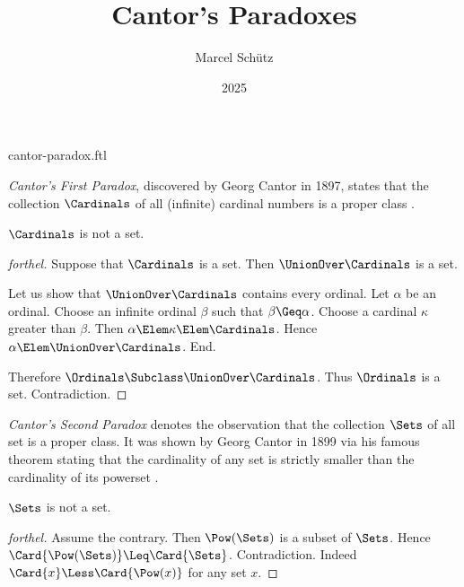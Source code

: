 \documentclass{stex}
\title{Cantor's Paradoxes}
\author{Marcel Schütz}
\date{2025}
\begin{document}
\begin{smodule}{cantor-paradox.ftl}



\maketitle

\noindent \emph{Cantor's First Paradox}, discovered by Georg Cantor in 1897,
states that the collection $\Cardinals$ of all (infinite) cardinal numbers is a
proper class \cite[chapter 156]{Cantor1991}.

\begin{theorem}[forthel,title=Cantor's First Paradox,name=Cantor Paradox I]
  $\Cardinals$ is not a set.
\end{theorem}
\begin{proof}[forthel]
  Suppose that $\Cardinals$ is a set.
  Then $\UnionOver \Cardinals$ is a set.

  Let us show that $\UnionOver \Cardinals$ contains every ordinal.
    Let $\alpha$ be an ordinal.
    Choose an infinite ordinal $\beta$ such that $\beta \Geq \alpha$.
    Choose a cardinal $\kappa$ greater than $\beta$.
    Then $\alpha \Elem \kappa \Elem \Cardinals$.
    Hence $\alpha \Elem \UnionOver \Cardinals$.
  End.

  Therefore $\Ordinals \Subclass \UnionOver \Cardinals$.
  Thus $\Ordinals$ is a set.
  Contradiction.
\end{proof}

\emph{Cantor's Second Paradox} denotes the observation that the collection
$\Sets$ of all set is a proper class.
It was shown by Georg Cantor in 1899 via his famous theorem stating that the
cardinality of any set is strictly smaller than the cardinality of its 
powerset \cite[chapter 163]{Cantor1991}.

\begin{theorem}[forthel,title=Cantor's Second Paradox,name=Cantor Paradox II]
  $\Sets$ is not a set.
\end{theorem}
\begin{proof}[forthel]
  Assume the contrary.
  Then $\Pow(\Sets)$ is a subset of $\Sets$.
  Hence $\Card{\Pow(\Sets)} \Leq \Card{\Sets}$.
  Contradiction.
  Indeed $\Card{x} \Less \Card{\Pow(x)}$ for any set $x$.
\end{proof}

\printbibliography
{}

\end{smodule}
\end{document}
